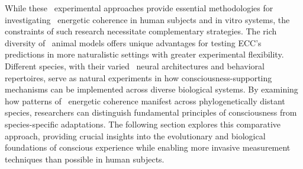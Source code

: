 While these~ experimental approaches provide essential methodologies for investigating~ energetic coherence in human subjects and in vitro systems, the constraints of such research necessitate complementary strategies. The rich diversity of~ animal models offers unique advantages for testing ECC's predictions in more naturalistic settings with greater experimental flexibility. Different species, with their varied~ neural architectures and behavioral repertoires, serve as natural experiments in how consciousness-supporting mechanisms can be implemented across diverse biological systems. By examining how patterns of~ energetic coherence manifest across phylogenetically distant species, researchers can distinguish fundamental principles of consciousness from species-specific adaptations. The following section explores this comparative approach, providing crucial insights into the evolutionary and biological foundations of conscious experience while enabling more invasive measurement techniques than possible in human subjects.
